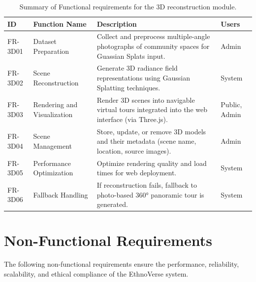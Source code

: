 \begin{table}[H]
\centering
\small
\begin{tabular}{p{1.5cm} p{3cm} p{8cm} p{2cm}}
\hline
\textbf{ID} & \textbf{Function Name} & \textbf{Description} & \textbf{Users} \\
\hline
FR-3D01 & Dataset Preparation & Collect and preprocess multiple-angle photographs of community spaces for Guassian Splats input. & Admin \\
FR-3D02 & Scene Reconstruction & Generate 3D radiance field representations using Gaussian Splatting techniques. & System \\
FR-3D03 & Rendering and Visualization & Render 3D scenes into navigable virtual tours integrated into the web interface (via Three.js). & Public, Admin \\
FR-3D04 & Scene Management & Store, update, or remove 3D models and their metadata (scene name, location, source images). & Admin \\
FR-3D05 & Performance Optimization & Optimize rendering quality and load times for web deployment. & System \\
FR-3D06 & Fallback Handling & If reconstruction fails, fallback to photo-based 360° panoramic tour is generated. & System \\
\hline
\end{tabular}
\caption{Summary of Functional requirements for the 3D reconstruction module.}
\end{table}





\section{Non-Functional Requirements}

The following non-functional requirements ensure the performance, reliability, scalability, and ethical compliance of the EthnoVerse system.


